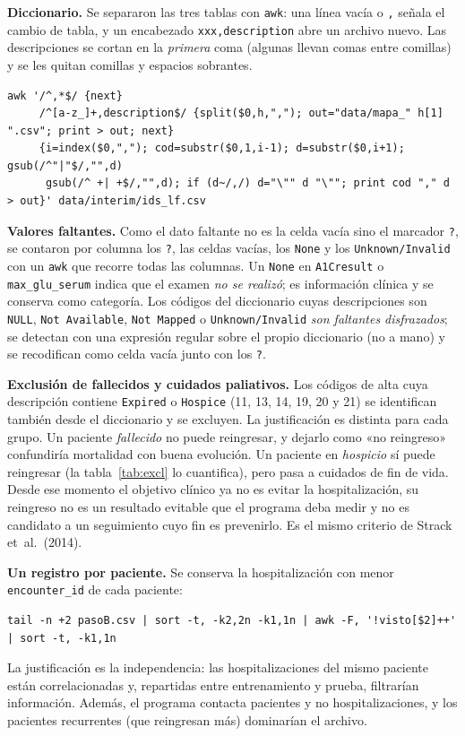 \documentclass[11pt,a4paper]{article}
\newcommand{\cod}[1]{\texttt{#1}}
\begin{document}
\textbf{Diccionario.} Se separaron las tres tablas con \cod{awk}: una línea vacía o \cod{,} señala el cambio de tabla, y un encabezado \cod{xxx,description} abre un archivo nuevo. Las descripciones se cortan en la \emph{primera} coma (algunas llevan comas entre comillas) y se les quitan comillas y espacios sobrantes.
\begin{lstlisting}
awk '/^,*$/ {next}
     /^[a-z_]+,description$/ {split($0,h,","); out="data/mapa_" h[1] ".csv"; print > out; next}
     {i=index($0,","); cod=substr($0,1,i-1); d=substr($0,i+1); gsub(/^"|"$/,"",d)
      gsub(/^ +| +$/,"",d); if (d~/,/) d="\"" d "\""; print cod "," d > out}' data/interim/ids_lf.csv
\end{lstlisting}

\textbf{Valores faltantes.} Como el dato faltante no es la celda vacía sino el marcador \cod{?}, se contaron por columna los \cod{?}, las celdas vacías, los \cod{None} y los \cod{Unknown/Invalid} con un \cod{awk} que recorre todas las columnas. Un \cod{None} en \cod{A1Cresult} o \cod{max\_glu\_serum} indica que el examen \emph{no se realizó}; es información clínica y se conserva como categoría. Los códigos del diccionario cuyas descripciones son \cod{NULL}, \cod{Not Available}, \cod{Not Mapped} o \cod{Unknown/Invalid} \emph{son faltantes disfrazados}; se detectan con una expresión regular sobre el propio diccionario (no a mano) y se recodifican como celda vacía junto con los \cod{?}.

\textbf{Exclusión de fallecidos y cuidados paliativos.} Los códigos de alta cuya descripción contiene \cod{Expired} o \cod{Hospice} (11, 13, 14, 19, 20 y 21) se identifican también desde el diccionario y se excluyen. La justificación es distinta para cada grupo. Un paciente \emph{fallecido} no puede reingresar, y dejarlo como «no reingreso» confundiría mortalidad con buena evolución. Un paciente en \emph{hospicio} sí puede reingresar (la tabla~\ref{tab:excl} lo cuantifica), pero pasa a cuidados de fin de vida. Desde ese momento el objetivo clínico ya no es evitar la hospitalización, su reingreso no es un resultado evitable que el programa deba medir y no es candidato a un seguimiento cuyo fin es prevenirlo. Es el mismo criterio de Strack et~al.~(2014).

\textbf{Un registro por paciente.} Se conserva la hospitalización con menor \cod{encounter\_id} de cada paciente:
\begin{lstlisting}
tail -n +2 pasoB.csv | sort -t, -k2,2n -k1,1n | awk -F, '!visto[$2]++' | sort -t, -k1,1n
\end{lstlisting}
La justificación es la independencia: las hospitalizaciones del mismo paciente están correlacionadas y, repartidas entre entrenamiento y prueba, filtrarían información. Además, el programa contacta pacientes y no hospitalizaciones, y los pacientes recurrentes (que reingresan más) dominarían el archivo.
\end{document}
